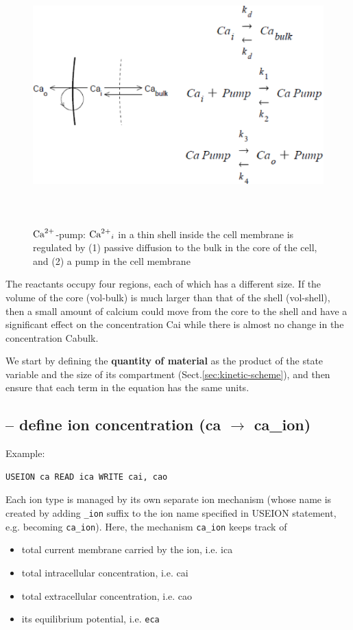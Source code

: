 \begin{figure}[hbt]
 \centerline{\includegraphics[height=10cm]{./images/Calcium-pump-scheme.eps}}
\caption{${\text{Ca}^{2+}}$-pump: ${\text{Ca}^{2+}}_i$ in a thin shell inside the cell membrane is
regulated by (1) passive diffusion to the bulk in the core of the cell, and (2)
a pump in the cell membrane
}
\label{fig:Calcium-pump-scheme}
\end{figure}


The reactants occupy four regions, each of which has a different size. If the
volume of the core (vol-bulk) is much larger than that of the shell (vol-shell),
then a small amount of calcium could move from the core to the shell and have a
significant effect on the concentration Cai while there is almost no change in
the concentration Cabulk.

We start by defining the {\bf quantity of material} as the product of the state
variable and the size of its compartment (Sect.\ref{sec:kinetic-scheme}), and
then ensure that each term in the equation has the same units.

\subsection{-- define ion concentration (ca $\rightarrow$ ca\_ion)}

Example:
\begin{verbatim}
USEION ca READ ica WRITE cai, cao
\end{verbatim}

Each ion type is managed by its own separate ion mechanism (whose name is
created by adding \verb!_ion! suffix to the ion name specified in USEION
statement, e.g. becoming \verb!ca_ion!).
Here, the mechanism \verb!ca_ion! keeps track of
\begin{itemize}
  \item total current membrane carried by the ion, i.e. ica
  \item total intracellular concentration, i.e. cai
  \item total extracellular concentration, i.e. cao
  \item its equilibrium potential, i.e. \verb!eca!
\end{itemize}




